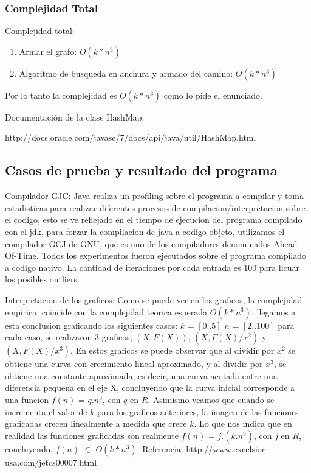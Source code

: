  \subsubsection{Complejidad Total}

 Complejidad total:
\begin{enumerate}

\item Armar el grafo: $O(k*n^3)$
\item Algoritmo de busqueda en anchura y armado del camino: $O(k*n^3)$
 \end{enumerate}
\vspace{2mm}
 Por lo tanto la complejidad es $O(k*n^3)$ como lo pide el enunciado.

\vspace{2mm}

Documentaci\'on de la clase HashMap:

 http://docs.oracle.com/javase/7/docs/api/java/util/HashMap.html



\subsection{Casos de prueba y resultado del programa} \label{ej_3:casos}

Compilador GJC: Java realiza un profiling sobre el programa a compilar y toma estadisticas para realizar diferentes procesos de compilacion/interpretacion sobre el codigo, esto se ve reflejado en el tiempo de ejecucion del programa compilado con el jdk, para forzar la compilacion de java a codigo objeto, utilizamos el compilador GCJ de GNU, que es uno de los compiladores denominados Ahead-Of-Time. Todos los experimentos fueron ejecutados sobre el programa compilado a codigo nativo. La cantidad de iteraciones por cada entrada es 100 para licuar los posibles outliers.

\vspace{2mm}

Interpretacion de los graficos: Como se puede ver en los graficos, la complejidad empirica, coincide con la complejidad teorica esperada $O(k*n^3)$, llegamos a esta conclusion graficando los siguientes casos: $k$ = $[0..5]$ $n$ = $[2..100]$ para cada caso, se realizaron 3 graficos, $(X,F(X))$,  $(X,F(X)/x^2)$ y $(X,F(X)/x^3)$. En estos graficos se puede observar que al dividir por $x^2$ se obtiene una curva con crecimiento lineal aproximado, y al dividir por $x^3$, se obtiene una constante aproximada, es decir, una curva acotada entre una diferencia pequena en el eje X, concluyendo que la curva inicial corresponde a una funcion $f(n)$ = $q.n^3$, con $q$ en $R$. Asimismo veamos que cuando se incrementa el valor de $k$ para los graficos anteriores, la imagen de las funciones graficadas crecen linealmente a medida que crece $k$. Lo que nos indica que en realidad las funciones graficadas son realmente $f(n)$ = $j.(k.n^3)$, con $j$ en $R$, concluyendo, $f(n)$ $\in$ $O(k*n^3)$. Referencia: http://www.excelsior-usa.com/jetcs00007.html

